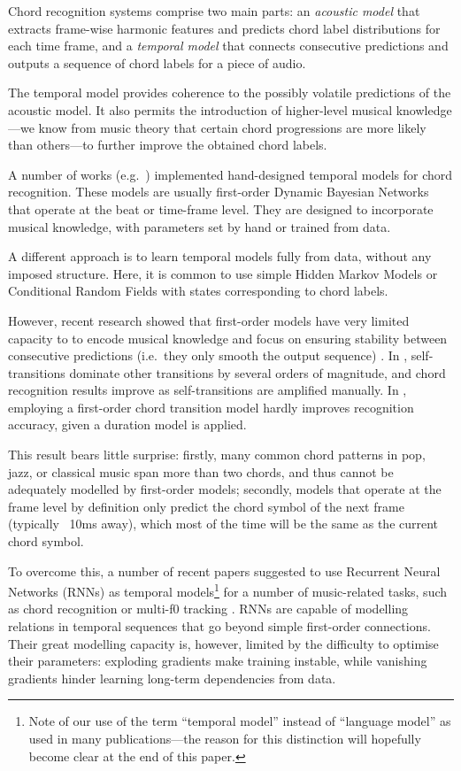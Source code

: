 \documentclass[twocolumn]{article}
\begin{document}
Chord recognition systems comprise two main parts: an \emph{acoustic model}
that extracts frame-wise harmonic features and predicts chord label
distributions for each time frame, and a \emph{temporal model} that connects
consecutive predictions and outputs a sequence of chord labels for a piece of
audio.

The temporal model provides coherence to the possibly volatile predictions of
the acoustic model. It also permits the introduction of higher-level musical
knowledge---we know from music theory that certain chord progressions are more
likely than others---to further improve the obtained chord labels.

A number of works (e.g.\ \cite{ni_endtoend_2012,pauwels_combining_2014,mauch_simultaneous_2010}) implemented hand-designed temporal models for chord
recognition. These models are usually first-order Dynamic Bayesian Networks
that operate at the beat or time-frame level. They are designed to incorporate
musical knowledge, with parameters set by hand or trained from data. 

A different approach is to learn temporal models fully from data, without any
imposed structure. Here, it is common to use simple Hidden Markov Models
\cite{cho2010exploring} or Conditional Random Fields
\cite{korzeniowski_fully_2016} with states corresponding to chord labels.

However, recent research showed that first-order models have very limited
capacity to to encode musical knowledge and focus on ensuring stability between
consecutive predictions (i.e.\, they only smooth the output sequence)
\cite{cho_relative_2014,chen_chord_2012}. In \cite{cho_relative_2014},
self-transitions dominate other transitions by several orders of magnitude, and
chord recognition results improve as self-transitions are amplified manually.
In \cite{chen_chord_2012}, employing a first-order chord transition model
hardly improves recognition accuracy, given a duration model is applied.

This result bears little surprise: firstly, many common chord patterns in pop,
jazz, or classical music span more than two chords, and thus cannot be
adequately modelled by first-order models; secondly, models that operate
at the frame level by definition only predict the chord symbol of the next
frame (typically ~10ms away), which most of the time will be the same as the
current chord symbol.

To overcome this, a number of recent papers suggested to use Recurrent Neural
Networks (RNNs) as temporal models\footnote{Note of our use of the term
``temporal model'' instead of ``language model'' as used in many
publications---the reason for this distinction will hopefully become clear at
the end of this paper.} for a number of music-related tasks, such as chord
recognition \cite{boulanger-lewandowski_audio_2013,sigtia_audio_2015} or
multi-f0 tracking \cite{sigtia_endtoend_2016}. RNNs are capable of modelling
relations in temporal sequences that go beyond simple first-order connections.
Their great modelling capacity is, however, limited by the difficulty to
optimise their parameters: exploding gradients make training instable, while
vanishing gradients hinder learning long-term dependencies from data.
\end{document}
